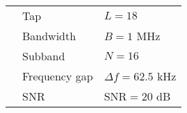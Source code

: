 \begin{table}[h!]
\begin{tabular}{lll}
                              & Tap                                & $L = 18$                             \\
                              & Bandwidth                          & $B = 1$ MHz                          \\
                              & Subband                            & $N = 16$                             \\
                              & Frequency gap                      & $\Delta f = 62.5$ kHz                \\
                              & SNR                                & $\text{SNR} = 20$ dB
\end{tabular}
\end{table}